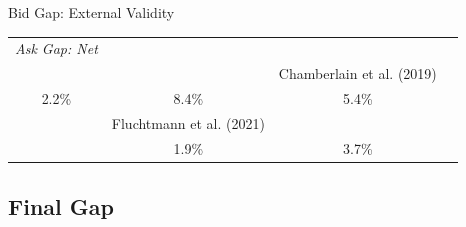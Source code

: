 \begin{frame}{Bid Gap: External Validity}
    \begin{table}[h!]
        \scriptsize
        \begin{center}
            \begin{tabular}{cccc}
                \hline
                \textcolor{frenchlilac!45!white}{\textit{Ask Gap: Net}} \\
                { \citet{roussille2021central}} & { \citet{blau2017gender}} &{ Chamberlain et al. (2019)} \\
                2.2\% & 8.4\% & 5.4\%  \\
                & { Fluchtmann et al. (2021)} & { \citet{le2021gender}} \\
                & 1.9\% & 3.7\% \\
                \hline
            \end{tabular}
        \end{center}
    \end{table}
\end{frame}

\subsection*{Final Gap}


